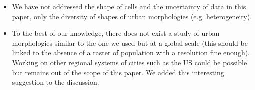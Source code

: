 \documentclass[11pt,a4paper,sans]{moderncv}        %
\begin{document}
\begin{itemize}
	\item We have not addressed the shape of cells and the uncertainty of data in this paper, only the diversity of shapes of urban morphologies (e.g. heterogeneity). 
	
	\item To the best of our knowledge, there does not exist a study of urban morphologies similar to the one we used but at a global scale (this should be linked to the absence of a raster of population with a resolution fine enough). Working on other regional systems of cities such as the US could be possible but remains out of the scope of this paper. We added this interesting suggestion to the discussion.
	

\end{itemize}
\end{document}

